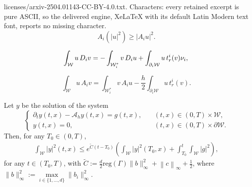 \documentclass[10pt,a4paper]{amsart}
\begin{document}
licenses/arxiv-2504.01143-CC-BY-4.0.txt. Characters: every retained excerpt is pure ASCII, so the delivered engine, XeLaTeX with its default Latin Modern text font, reports no missing character.
\begin{equation}\label{eq:promedioinequality}
A_{i}(|u|^{2})\geq \left|A_{i}u\right|^{2}.
\end{equation}

\begin{equation}\label{eq:int:dif}
    \int_{\mathcal{W}}u\,D_{i}v=-\int_{\mathcal{W}_{i}^{\ast}}v\,D_{i}u+\int_{\partial_{i}\mathcal{W}}u\,t_{r}^{i}(v)\nu_{i},\\
\end{equation}    

\begin{equation}\label{eq:int:ave}
    \int_{\mathcal{W}}u\,A_{i}v=\int_{\mathcal{W}_{i}^{\ast}}v\,A_{i}u-\frac{h}{2}\int_{\partial_{i} \mathcal{W}}u\,t_{r}^{i}(v).
\end{equation}

\begin{lemma}\label{lem:energy:estimate}
    Let $y$ be the solution of the system
    \begin{equation}\label{system:semi-discrete}
\begin{cases}
    \partial_{t}y(t,x)-\mathcal{A}_{h}y(t,x)=g(t,x),\quad &(t,x)\in(0,T)\times \mathcal{W},\\
    y(t,x)=0,  &(t,x)\in(0,T)\times\partial\mathcal{W}.
\end{cases}
\end{equation}
Then, for any $T_{0}\in(0,T)$,
\begin{align}\label{ine:energy:T0}
        \int_\mathcal{W} |y|^2(t,x)
        \leq e^{\tilde{C}(t-T_{0})}\left(\int_\mathcal{W} |y|^2(T_{0},x)+\int_{T_{0}}^{t}\int_{\mathcal{W}} |g|^2\right),
\end{align}
for any $t\in (T_{0},T)$, with $\tilde{C}:= \frac{d}{2}\mathrm {reg}(\Gamma)\|b\|^2_\infty+\left\| c\right\|_{\infty}+\frac{1}{2}$, where $\|b\|_\infty^2:= \max\limits_{i\in\{1,...,d\}}\|b_i\|^2_\infty$.
\end{lemma}
\end{document}
